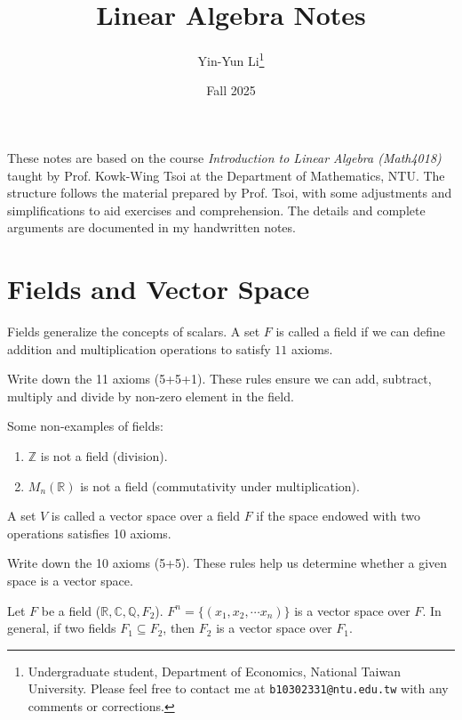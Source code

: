 \documentclass[12pt]{article}
\title{Linear Algebra Notes}
\author{Yin-Yun Li\thanks{Undergraduate student, Department of Economics, National Taiwan University. Please feel free to contact me at \texttt{b10302331@ntu.edu.tw} with any comments or corrections.}}
\date{Fall 2025}
\begin{document}
\maketitle

These notes are based on the course \emph{Introduction to Linear Algebra (Math4018)} taught by Prof. Kowk-Wing Tsoi at the Department of Mathematics, NTU. 
The structure follows the material prepared by Prof. Tsoi, with some adjustments and simplifications to aid exercises and comprehension. 
The details and complete arguments are documented in my handwritten notes.




\newpage
\tableofcontents


\newpage
\section{Fields and Vector Space}

Fields generalize the concepts of scalars. A set $F$ is called a field if we can define addition and multiplication operations to satisfy $11$ axioms.
\begin{exercise}
Write down the 11 axioms (5+5+1). These rules ensure we can add, subtract, multiply and divide by non-zero element in the field.
\end{exercise}

\begin{example}
    Some non-examples of fields:
    \begin{enumerate}
        \item $\mathbb{Z}$ is not a field (division).
        \item $M_n(\mathbb{R})$ is not a field (commutativity under multiplication).
    \end{enumerate}
\end{example}

A set $V$ is called a vector space over a field $F$ if the space endowed with two operations satisfies 10 axioms.
\begin{exercise}
Write down the 10 axioms (5+5). 
These rules help us determine whether a given space is a vector space.
\end{exercise}

\begin{example}
    Let $F$ be a field ($\mathbb{R}, \mathbb{C}, \mathbb{Q}, F_2$).
    $F^n = \{(x_1,x_2,\cdots x_n)\}$ is a vector space over $F$.
    In general, if two fields $F_1\subseteq F_2$, then $F_2$ is a vector space over $F_1$.
\end{example}
\end{document}
